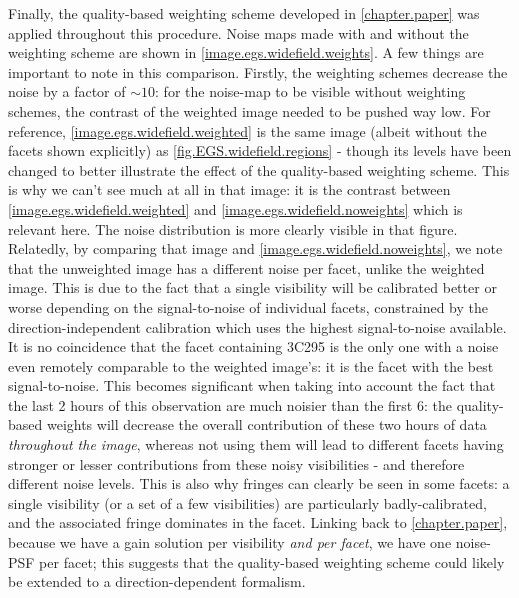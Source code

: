 \pg
Finally, the quality-based weighting scheme developed in \cref{chapter.paper} was applied throughout this procedure. Noise maps made with and without the weighting scheme are shown in \cref{image.egs.widefield.weights}. A few things are important to note in this comparison. Firstly, the weighting schemes decrease the noise by a factor of $\sim10$: for the noise-map to be visible without weighting schemes, the contrast of the weighted image needed to be pushed way low. For reference, \cref{image.egs.widefield.weighted} is the same image (albeit without the facets shown explicitly) as \cref{fig.EGS.widefield.regions} - though its levels have been changed to better illustrate the effect of the quality-based weighting scheme. This is why we can't see much at all in that image: it is the contrast between \cref{image.egs.widefield.weighted} and \cref{image.egs.widefield.noweights} which is relevant here. The noise distribution is more clearly visible in that figure. Relatedly, by comparing that image and \cref{image.egs.widefield.noweights}, we note that the unweighted image has a different noise per facet, unlike the weighted image. This is due to the fact that a single visibility will be calibrated better or worse depending on the signal-to-noise of individual facets, constrained by the direction-independent calibration which uses the highest signal-to-noise available. It is no coincidence that the facet containing 3C295 is the only one with a noise even remotely comparable to the weighted image's: it is the facet with the best signal-to-noise. This becomes significant when taking into account the fact that the last 2 hours of this observation are much noisier than the first 6: the quality-based weights will decrease the overall contribution of these two hours of data \textit{throughout the image}, whereas not using them will lead to different facets having stronger or lesser contributions from these noisy visibilities - and therefore different noise levels. This is also why fringes can clearly be seen in some facets: a single visibility (or a set of a few visibilities) are particularly badly-calibrated, and the associated fringe dominates in the facet. Linking back to \cref{chapter.paper}, because we have a gain solution per visibility \textit{and per facet}, we have one noise-PSF per facet; this suggests that the quality-based weighting scheme could likely be extended to a direction-dependent formalism.

